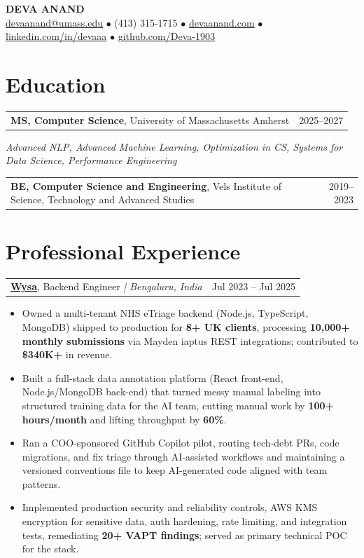 \documentclass[letterpaper,11pt]{article}
\makeatletter
\newcommand{\eduItem}[3]{%
  \begin{tabular*}{\textwidth}{@{}l@{\extracolsep{\fill}}r@{}}
    \textbf{#1}, #2 & #3 \\
  \end{tabular*}\par
}
\newcommand{\expItem}[4]{%
  \vspace{2pt}
  \begin{tabular*}{\textwidth}{@{}l@{\extracolsep{\fill}}r@{}}
    \textbf{#1}, #2 \textit{| #3} & #4 \\
  \end{tabular*}\par\vspace{-2pt}
}
\makeatother
\begin{document}
\begin{center}
    {\fontsize{18}{20}\selectfont\bfseries DEVA ANAND}\\ \vspace{3pt}
    {\small
    \href{mailto:devaanand@umass.edu}{devaanand@umass.edu}
    \enspace$\bullet$\enspace
    (413) 315-1715
    \enspace$\bullet$\enspace
    \href{https://devaanand.com}{devaanand.com}
    \enspace$\bullet$\enspace
    \href{https://linkedin.com/in/devaaa/}{linkedin.com/in/devaaa}
    \enspace$\bullet$\enspace
    \href{https://github.com/Deva-1903}{github.com/Deva-1903}}
\end{center}
\vspace{-6pt}

\section{Education}
\eduItem{MS, Computer Science}{University of Massachusetts Amherst}{2025--2027}
{\small\textit{Advanced NLP, Advanced Machine Learning, Optimization in CS, Systems for Data Science, Performance Engineering}}\par
\vspace{3pt}
\eduItem{BE, Computer Science and Engineering}{Vels Institute of Science, Technology and Advanced Studies}{2019--2023}

\section{Professional Experience}

\expItem{\href{https://www.wysa.io}{Wysa}}{Backend Engineer}{Bengaluru, India}{Jul 2023 -- Jul 2025}
\begin{itemize}
  \item Owned a multi-tenant NHS eTriage backend (Node.js, TypeScript, MongoDB) shipped to production for \textbf{8+ UK clients}, processing \textbf{10{,}000+ monthly submissions} via Mayden iaptus REST integrations; contributed to \textbf{\$340K+} in revenue.
  \item Built a full-stack data annotation platform (React front-end, Node.js/MongoDB back-end) that turned messy manual labeling into structured training data for the AI team, cutting manual work by \textbf{100+ hours/month} and lifting throughput by \textbf{60\%}.
  \item Ran a COO-sponsored GitHub Copilot pilot, routing tech-debt PRs, code migrations, and fix triage through AI-assisted workflows and maintaining a versioned conventions file to keep AI-generated code aligned with team patterns.
  \item Implemented production security and reliability controls, AWS KMS encryption for sensitive data, auth hardening, rate limiting, and integration tests, remediating \textbf{20+ VAPT findings}; served as primary technical POC for the stack.
\end{itemize}
\end{document}
